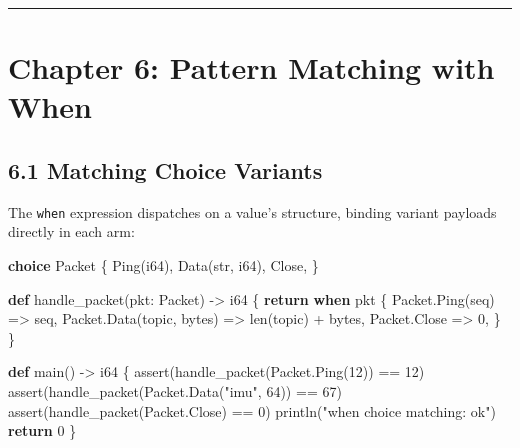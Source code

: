 \documentclass[
  english,
  oneside]{book}
\newenvironment{Shaded}{\begin{snugshade}}{\end{snugshade}}
\newcommand{\ControlFlowTok}[1]{\textcolor[rgb]{0.77,0.53,0.75}{\textbf{#1}}}
\newcommand{\DataTypeTok}[1]{\textcolor[rgb]{0.31,0.79,0.69}{#1}}
\newcommand{\DecValTok}[1]{\textcolor[rgb]{0.71,0.81,0.66}{#1}}
\newcommand{\FunctionTok}[1]{\textcolor[rgb]{0.86,0.86,0.67}{#1}}
\newcommand{\KeywordTok}[1]{\textcolor[rgb]{0.34,0.61,0.84}{\textbf{#1}}}
\newcommand{\NormalTok}[1]{\textcolor[rgb]{0.83,0.83,0.83}{#1}}
\newcommand{\OperatorTok}[1]{\textcolor[rgb]{0.83,0.83,0.83}{#1}}
\newcommand{\StringTok}[1]{\textcolor[rgb]{0.81,0.57,0.47}{#1}}
\begin{document}
\begin{center}\rule{0.5\linewidth}{0.5pt}\end{center}

\chapter{Chapter 6: Pattern Matching with
When}\label{chapter-6-pattern-matching-with-when}

\section{6.1 Matching Choice Variants}\label{matching-choice-variants}

The \texttt{when} expression dispatches on a value's structure, binding
variant payloads directly in each arm:

\begin{Shaded}
\begin{Highlighting}[]
\KeywordTok{choice}\NormalTok{ Packet \{}
\NormalTok{    Ping(}\DataTypeTok{i64}\NormalTok{),}
\NormalTok{    Data(}\DataTypeTok{str}\NormalTok{, }\DataTypeTok{i64}\NormalTok{),}
\NormalTok{    Close,}
\NormalTok{\}}

\KeywordTok{def}\NormalTok{ handle\_packet(pkt: Packet) }\OperatorTok{{-}\textgreater{}} \DataTypeTok{i64}\NormalTok{ \{}
    \ControlFlowTok{return} \ControlFlowTok{when}\NormalTok{ pkt \{}
\NormalTok{        Packet}\OperatorTok{.}\NormalTok{Ping(seq) }\OperatorTok{=\textgreater{}}\NormalTok{ seq,}
\NormalTok{        Packet}\OperatorTok{.}\NormalTok{Data(topic, bytes) }\OperatorTok{=\textgreater{}} \FunctionTok{len}\NormalTok{(topic) }\OperatorTok{+}\NormalTok{ bytes,}
\NormalTok{        Packet}\OperatorTok{.}\NormalTok{Close }\OperatorTok{=\textgreater{}} \DecValTok{0}\NormalTok{,}
\NormalTok{    \}}
\NormalTok{\}}

\KeywordTok{def}\NormalTok{ main() }\OperatorTok{{-}\textgreater{}} \DataTypeTok{i64}\NormalTok{ \{}
    \FunctionTok{assert}\NormalTok{(handle\_packet(Packet}\OperatorTok{.}\NormalTok{Ping(}\DecValTok{12}\NormalTok{)) }\OperatorTok{==} \DecValTok{12}\NormalTok{)}
    \FunctionTok{assert}\NormalTok{(handle\_packet(Packet}\OperatorTok{.}\NormalTok{Data(}\StringTok{"imu"}\NormalTok{, }\DecValTok{64}\NormalTok{)) }\OperatorTok{==} \DecValTok{67}\NormalTok{)}
    \FunctionTok{assert}\NormalTok{(handle\_packet(Packet}\OperatorTok{.}\NormalTok{Close) }\OperatorTok{==} \DecValTok{0}\NormalTok{)}
\NormalTok{    println(}\StringTok{"when choice matching: ok"}\NormalTok{)}
    \ControlFlowTok{return} \DecValTok{0}
\NormalTok{\}}
\end{Highlighting}
\end{Shaded}
\end{document}
